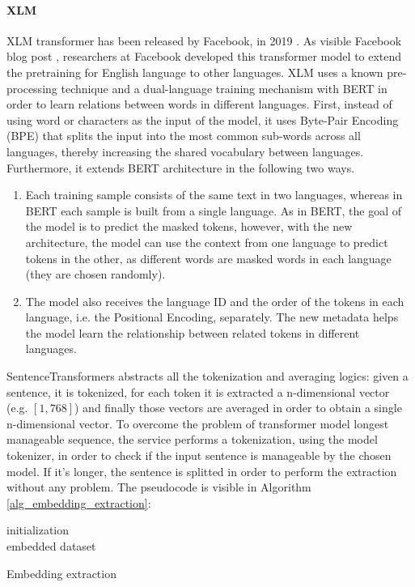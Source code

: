 \documentclass[\main/main.tex]{subfiles}
\begin{document}
\paragraph{XLM}
XLM transformer has been released by Facebook, in 2019 \cite{DBLP:journals/corr/abs-1901-07291}. As visible Facebook blog post \cite{xlm_blog_post}, researchers at Facebook developed this transformer model to extend the pretraining for English language to other languages. XLM uses a known pre-processing technique and a dual-language training mechanism with BERT in order to learn relations between words in different languages. First, instead of using word or characters as the input of the model, it uses Byte-Pair Encoding (BPE) that splits the input into the most common sub-words across all languages, thereby increasing the shared vocabulary between languages. Furthermore, it extends BERT architecture in the following two ways.
\begin{enumerate}
    \item Each training sample consists of the same text in two languages, whereas in BERT each sample is built from a single language. As in BERT, the goal of the model is to predict the masked tokens, however, with the new architecture, the model can use the context from one language to predict tokens in the other, as different words are masked words in each language (they are chosen randomly).
    \item The model also receives the language ID and the order of the tokens in each language, i.e. the Positional Encoding, separately. The new metadata helps the model learn the relationship between related tokens in different languages.
\end{enumerate}


SentenceTransformers abstracts all the tokenization and averaging logics: given a sentence, it is tokenized, for each token it is extracted a n-dimensional vector (e.g. $[1, 768]$) and finally those vectors are averaged in order to obtain a single n-dimensional vector. To overcome the problem of transformer model longest manageable sequence, the service performs a tokenization, using the model tokenizer, in order to check if the input sentence is manageable by the chosen model. If it's longer, the sentence is splitted in order to perform the extraction without any problem. The pseudocode is visible in Algorithm \ref{alg_embedding_extraction}:
\begin{center}
    \begin{algorithm}[H]
     initialization \\
     \Return embedded dataset
     \caption{Embedding extraction}
     \label{alg_embedding_extraction}
    \end{algorithm}
\end{center}
\end{document}
